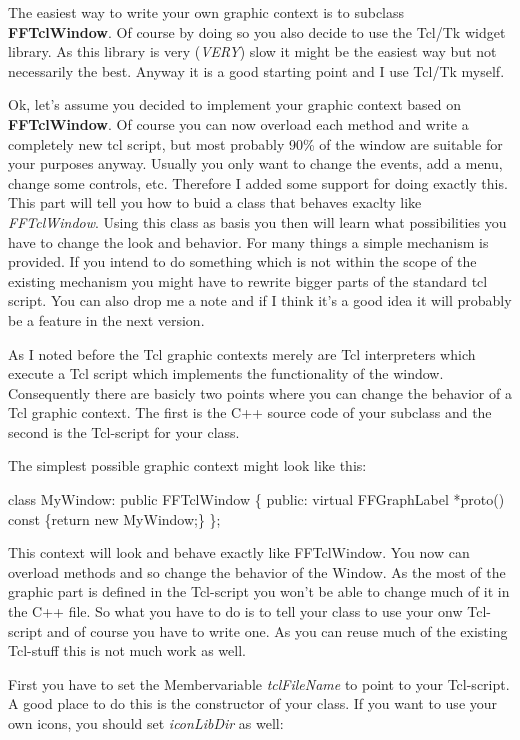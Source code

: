 The easiest way to write your own graphic context is to subclass {\bf
FFTclWindow}. Of course by doing so you also decide to use the Tcl/Tk
widget library. As this library is very ({\em VERY}) slow it might
be the easiest way but not necessarily the best. Anyway it is a good
starting point and I use Tcl/Tk myself. 

Ok, let's assume you decided to implement your graphic context based
on {\bf FFTclWindow}. Of course you can now overload each method and
write a completely new tcl script, but most probably 90\% of the
window are suitable for your purposes anyway. Usually you only want to
change the events, add a menu, change some controls, etc. Therefore I
added some support for doing exactly this. This part will tell you
how to buid a class that behaves exaclty like {\em FFTclWindow}. Using
this class as basis you then will learn what possibilities you have to
change the look and behavior. For many things a simple mechanism is
provided. If you intend to do something which is not within the scope
of the existing mechanism you might have to rewrite bigger parts of
the standard tcl script. You can also drop me a note and if I think
it's a good idea it will probably be a feature in the next version.

As I noted before the Tcl graphic contexts merely are Tcl interpreters
which execute a Tcl script which implements the functionality of the
window. Consequently there are basicly two points where you can change
the behavior of a Tcl graphic context. The first is the C++ source
code of your subclass and the second is the Tcl-script for your class.
 
The simplest possible graphic context might look like this:

{\tt

class MyWindow: public FFTclWindow
\{
public:
 virtual FFGraphLabel *proto() const \{return new MyWindow;\}
\};
}

This context will look and behave exactly like FFTclWindow. You now
can overload methods and so change the behavior of the Window. As the
most of the graphic part is defined in the Tcl-script you won't be
able to change much of it in the C++ file. So what you have to do is to tell
your class to use your onw Tcl-script and of course you have to write
one. As you can reuse much of the existing Tcl-stuff this is not much
work as well. 

First you have to set the Membervariable {\em tclFileName} to point to
your Tcl-script. A good place to do this is the constructor of your
class. If you want to use your own icons, you should set {\em
iconLibDir} as well:

